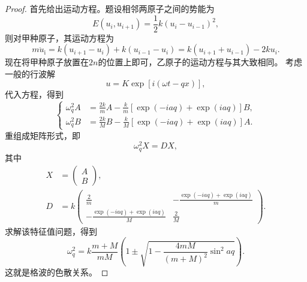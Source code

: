 \begin{proof}\small
    首先给出运动方程。题设相邻两原子之间的势能为
    \begin{equation}
        E(u_i, u_{i+1}) = \frac{1}{2} k (u_i - u_{i-1})^2,
    \end{equation}
    则对甲种原子，其运动方程为
    \begin{equation}
        m \ddot u_\text{i} = k(u_{i+1} - u_i) + k(u_{i-1} - u_i) = k(u_{i+1} + u_{i-1}) - 2ku_i.
    \end{equation}
    现在将甲种原子放置在$2n$的位置上即可，乙原子的运动方程与其大致相同。
    考虑一般的行波解
    \begin{equation}
        u = K \exp[i(\omega t - qx)],
    \end{equation}
    代入方程，得到
    \begin{equation}
        \left\{
        \begin{aligned}
            \omega_q^2 A &= \frac{2k}{m} A - \frac{k}{m}[\exp(-iaq) + \exp(i aq)] B, \\
            \omega_q^2 B &= \frac{2k}{M} B - \frac{k}{M}[\exp(-i aq) + \exp(i aq)] A.
        \end{aligned}
        \right.
    \end{equation}
    重组成矩阵形式，即
    \begin{equation}
        \omega_q^2 X = D X,
    \end{equation}
    其中
    \begin{equation}
        \begin{aligned}
            X &= \begin{pmatrix}
                A \\ B
            \end{pmatrix}, \\
            D &= k \begin{pmatrix}
                \frac{2}{m} & - \frac{\exp(-iaq) + \exp(iaq)}{m} \\
                - \frac{\exp(-i aq) + \exp(iaq)}{M} & \frac{2}{M}
            \end{pmatrix}.
        \end{aligned}
    \end{equation}
    求解该特征值问题，得到
    \begin{equation}
        \omega_q^2 = k \frac{m+M}{mM} \left( 1 \pm \sqrt{1 - \frac{4mM}{(m+M)^2} \sin^2 aq} \right).
    \end{equation}
    这就是格波的色散关系。
\end{proof}

